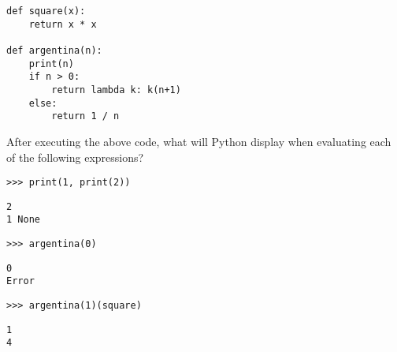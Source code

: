 \begin{blocksection}
\question 
\begin{lstlisting}
def square(x): 
    return x * x 
		
def argentina(n):
    print(n) 
    if n > 0: 
        return lambda k: k(n+1) 
    else: 
        return 1 / n
\end{lstlisting}

After executing the above code, what will Python
display when evaluating each of the following expressions?

\begin{lstlisting}
>>> print(1, print(2))
\end{lstlisting}
\begin{solution}[0.5in]
\begin{lstlisting}
2
1 None
\end{lstlisting}
\end{solution}

\begin{lstlisting}
>>> argentina(0)
\end{lstlisting}
\begin{solution}[0.5in]
\begin{lstlisting}
0
Error
\end{lstlisting}
\end{solution}

\begin{lstlisting}
>>> argentina(1)(square)
\end{lstlisting}
\begin{solution}[0.5in]
\begin{lstlisting}
1
4
\end{lstlisting}
\end{solution}
\end{blocksection}
